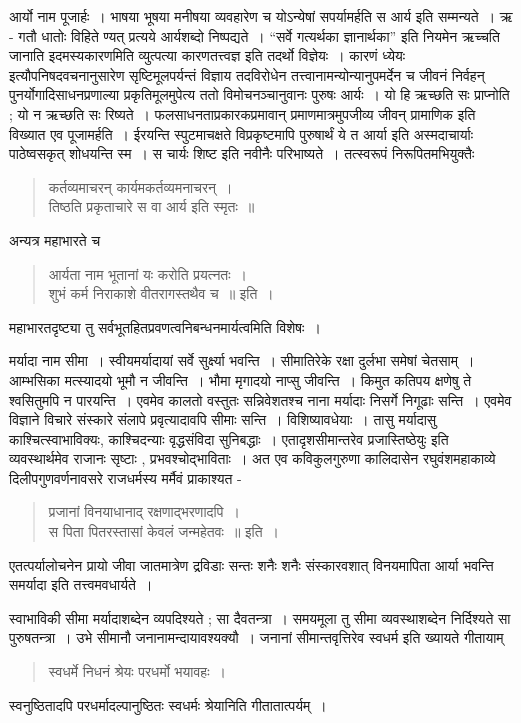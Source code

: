 {आर्यो नाम पूजार्हः~। भाषया भूषया मनीषया व्यवहारेण च योऽन्येषां सपर्यामर्हति स आर्य इति सम्मन्यते~। ऋ - गतौ धातोः विहिते ण्यत् प्रत्यये आर्यशब्दो निष्पद्यते~। “सर्वे गत्यर्थका ज्ञानार्थका” इति नियमेन ऋच्चति जानाति इदमस्यकारणमिति व्युत्पत्या कारणतत्त्वज्ञ इति तदर्थो विज्ञेयः~। कारणं ध्येयः इत्यौपनिषदवचनानुसारेण सृष्टिमूलपर्यन्तं विज्ञाय तदविरोधेन तत्त्वानामन्योन्यानुपमर्देन च जीवनं निर्वहन् पुनर्योगादिसाधनप्रणाल्या प्रकृतिमूलमुपेत्य ततो विमोचनञ्चानुवानः पुरुषः आर्यः~। यो हि ऋच्छति सः प्राप्नोति ; यो न ऋच्छति सः रिष्यते~। फलसाधनताप्रकारकप्रमावान् प्रमाणमात्रमुपजीव्य जीवन् प्रामाणिक इति विख्यात एव पूजामर्हति~। ईरयन्ति स्पुटमाचक्षते विप्रकृष्टमापि पुरुषार्थं ये त आर्या इति अस्मदाचार्याः पाठेष्वसकृत् शोधयन्ति स्म~। स चार्यः शिष्ट इति नवीनैः परिभाष्यते~। तत्स्वरूपं निरूपितमभियुक्तैः 
\begin{verse}
कर्तव्यमाचरन् कार्यमकर्तव्यमनाचरन्~। \\
तिष्ठति प्रकृताचारे स वा आर्य इति स्मृतः~॥
\end{verse}
अन्यत्र महाभारते च  
\begin{verse}
आर्यता नाम भूतानां यः करोति प्रयत्नतः~। \\
शुभं कर्म निराकाशे वीतरागस्तथैव च~॥ इति~। 
\end{verse}
महाभारतदृष्ट्या तु सर्वभूतहितप्रवणत्वनिबन्धनमार्यत्वमिति विशेषः~। 

मर्यादा नाम सीमा~। स्वीयमर्यादायां सर्वे सुर्क्ष्या भवन्ति~। सीमातिरेके रक्षा दुर्लभा समेषां चेतसाम्~। आम्भसिका मत्स्यादयो भूमौ न जीवन्ति~। भौमा मृगादयो नाप्सु जीवन्ति~। किमुत कतिपय क्षणेषु ते श्वसितुमपि न पारयन्ति~। एवमेव कालतो वस्तुतः सन्निवेशतश्च नाना मर्यादाः निसर्गे निगूढाः सन्ति~। एवमेव विज्ञाने विचारे संस्कारे संलापे प्रवृत्यादावपि सीमाः सन्ति~। विशिष्यावधेयाः~। तासु मर्यादासु काश्चित्स्वाभाविक्यः, काश्चिदन्याः वृद्धसंविदा सुनिबद्धाः~। एतादृशसीमान्तरेव प्रजास्तिष्ठेयुः इति व्यवस्थार्थमेव राजानः सृष्टाः , प्रभवश्चोद्भाविताः~। अत एव कविकुलगुरुणा कालिदासेन रघुवंशमहाकाव्ये दिलीपगुणवर्णनावसरे राजधर्मस्य मर्मैवं प्राकाश्यत -
\begin{verse}
प्रजानां विनयाधानाद् रक्षणाद्भरणादपि~। \\ 
स पिता पितरस्तासां केवलं जन्महेतवः~॥ इति~। 
\end{verse}
एतत्पर्यालोचनेन प्रायो जीवा जातमात्रेण द्रविडाः सन्तः शनैः शनैः संस्कारवशात् विनयमापिता आर्या भवन्ति समर्यादा इति तत्त्वमवधार्यते~। 

स्वाभाविकी सीमा मर्यादाशब्देन व्यपदिश्यते ; सा दैवतन्त्रा~। समयमूला तु सीमा व्यवस्थाशब्देन निर्दिश्यते सा पुरुषतन्त्रा~।  उभे सीमानौ जनानामन्दायावश्यक्यौ~। जनानां सीमान्तवृत्तिरेव स्वधर्म इति ख्यायते गीतायाम्  
\begin{verse}
स्वधर्मे निधनं श्रेयः परधर्मो भयावहः~। 
\end{verse}
स्वनुष्ठितादपि परधर्मादल्पानुष्ठितः स्वधर्मः श्रेयानिति गीतातात्पर्यम्~। 

}
